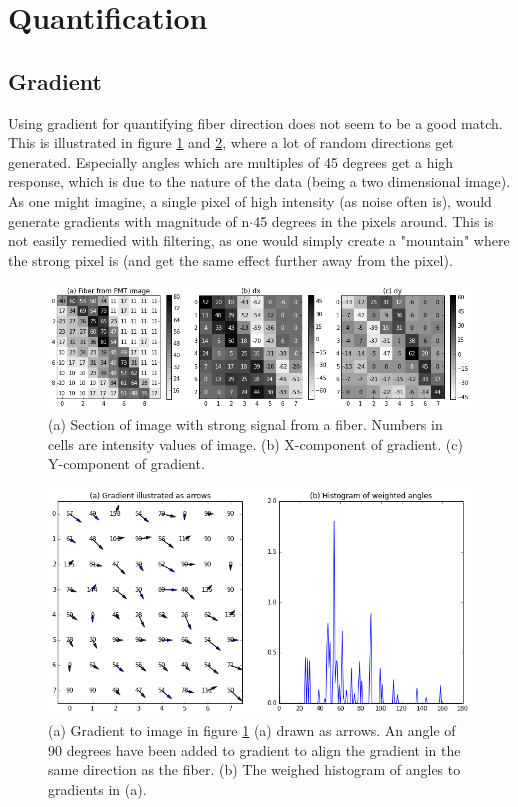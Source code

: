 \section{Quantification}

\subsection{Gradient}
Using gradient for quantifying fiber direction does not seem to be a good match. This is illustrated in figure \ref{fig:grad} and \ref{fig:grad_arr}, where a lot of random directions get generated. Especially angles which are multiples of 45 degrees get a high response, which is due to the nature of the data (being a two dimensional image). As one might imagine, a single pixel of high intensity (as noise often is), would generate gradients with magnitude of n$\cdot$45 degrees in the pixels around. This is not easily remedied with filtering, as one would simply create a "mountain" where the strong pixel is (and get the same effect further away from the pixel).

\begin{figure}[h]
\centering
\includegraphics[width=\textwidth]{gradient}
\caption{(a) Section of image with strong signal from a fiber. Numbers in cells are intensity values of image. (b) X-component of gradient. (c) Y-component of gradient.}
\label{fig:grad}
\end{figure}

\begin{figure}[H]
\centering
\includegraphics[width=\textwidth]{gradient_arrow}
\caption{(a) Gradient to image in figure \ref{fig:grad} (a) drawn as arrows. An angle of 90 degrees have been added to gradient to align the gradient in the same direction as the fiber. (b) The weighed histogram of angles to gradients in (a).}
\label{fig:grad_arr}
\end{figure}

